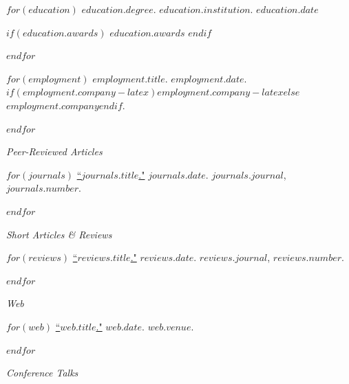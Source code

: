 \documentclass[11pt,article,oneside]{memoir}
\begin{document}
\medskip

\reversemarginpar

\bigskip


$for(education)$
\ind $education.degree$. $education.institution$. $education.date$

$if(education.awards)$
\ind \hspace{0.35in} \footnotesize $education.awards$ \normalsize \vspace{0.05in}
$endif$

\smallskip
$endfor$

\bigskip


$for(employment)$
\ind $employment.title$. $employment.date$. $if(employment.company-latex)$$employment.company-latex$$else$$employment.company$$endif$.

\smallskip
$endfor$

\bigskip
\pagebreak[1]


\ind \emph{Peer-Reviewed Articles}

\smallskip

$for(journals)$
\ind \href{$journals.url$}{``$journals.title$."} $journals.date$. \emph{$journals.journal$}, $journals.number$.

\smallskip
$endfor$
\medskip

\ind \emph{Short Articles \& Reviews}

\smallskip

$for(reviews)$
\ind \href{$reviews.url$}{``$reviews.title$."} $reviews.date$. \emph{$reviews.journal$}, $reviews.number$.

\smallskip
$endfor$
\medskip

\ind \emph{Web}

\smallskip

$for(web)$
\ind \href{$web.url$}{``$web.title$."} $web.date$. \emph{$web.venue$}. 

\smallskip
$endfor$

\bigskip
\pagebreak[1]


\ind \emph{Conference Talks}
\end{document}
